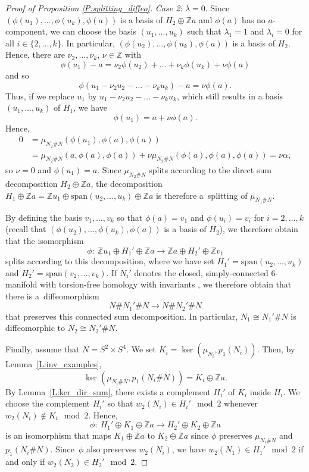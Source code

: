 \documentclass[pdftex]{sigma}
\numberwithin{equation}{section}
\theoremstyle{definition}
\numberwithin{table}{section}
\newcommand{\Z}{\mathbb{Z}}
\begin{document}
\begin{proof}[Proof of Proposition \ref{P:splitting_diffeo}]
\emph{Case 2}: $\lambda=0$. Since $(\phi(u_1),\dots,\phi(u_k),\phi(a))$ is a basis of $H_2\oplus\Z a$ and $\phi(a)$ has no $a$\nobreakdash-component, we can choose the basis $(u_1,\dots,u_k)$ such that $\lambda_1=1$ and $\lambda_i=0$ for all $i\in\{2,\dots,k\}$. In particular, $(\phi(u_2),\dots,\phi(u_k),\phi(a))$ is a basis of $H_2$. Hence, there are $\nu_2,\dots,\nu_k$, ${\nu\in\Z}$ with
		\[ \phi(u_1)-a=\nu_2\phi(u_2)+\dots+\nu_k\phi(u_k)+\nu\phi(a) \]
		and so
		\[ \phi(u_1-\nu_2 u_2 -\dots-\nu_k u_k )-a=\nu\phi(a). \]
		Thus, if we replace $u_1$ by $u_1-\nu_2 u_2 -\dots-\nu_k u_k$, which still results in a basis $(u_1,\dots,u_k)$ of $H_1$, we have
		\[ \phi(u_1)=a+\nu\phi(a). \]
Hence,
		\begin{align*}
        0&=\mu_{N_2\#N}(\phi(u_1),\phi(a),\phi(a))\\
        &=\mu_{N_2\#N}(a,\phi(a),\phi(a))+\nu\mu_{N_2\#N}(\phi(a),\phi(a),\phi(a))=\nu\alpha,
        \end{align*}
		so $\nu=0$ and $\phi(u_1)=a$. Since $\mu_{N_2\# N}$ splits according to the direct sum decomposition $H_2\oplus\Z a$, the decomposition $H_1\oplus \Z a=\Z u_1\oplus \mathrm{span}(u_2,\dots,u_k)\oplus \Z a$ is therefore a~splitting of $\mu_{N_1\# N}$.
		
		By defining the basis $v_1,\dots,v_k$ so that $\phi(a)=v_1$ and $\phi(u_i)=v_i$ for $i=2,\dots,k$ (recall that $(\phi(u_2),\dots,\phi(u_k),\phi(a))$ is a basis of $H_2$), we therefore obtain that the isomorphism
		\[ \phi\colon\ \Z u_1\oplus H_1'\oplus \Z a\to \Z a\oplus H_2'\oplus \Z v_1 \]
		splits according to this decomposition, where we have set $H_1'=\mathrm{span}(u_2,\dots,u_k)$ and $H_2'=\mathrm{span}(v_2,\dots,v_k)$. If $N_i'$ denotes the closed, simply-connected $6$-manifold with torsion-free homology with invariants , we therefore obtain that there is a~diffeomorphism
		\[ N\# N_1'\# N\to N\# N_2'\# N \]
		that preserves this connected sum decomposition. In particular, $N_1\cong N_1'\# N$ is diffeomorphic to $N_2\cong N_2'\# N$.
	
	Finally, assume that $N=S^2\times S^4$. We set $K_i=\ker(\mu_{N_i},p_1(N_i))$. Then, by Lemma~\ref{L:inv_examples},
	\[\ker(\mu_{N_i\# N},p_1(N_i\#N))=K_i\oplus\Z a.\]
	By Lemma~\ref{L:ker_dir_sum}, there exists a complement $H_i'$ of $K_i$ inside $H_i$. We choose the complement $H_i'$ so that $w_2(N_i)\in H_i'\mod 2$ whenever $w_2(N_i)\not\in K_i\mod 2$. Hence,
	\[ \phi\colon\ H_1'\oplus K_1\oplus\Z a\to H_2'\oplus K_2\oplus\Z a \]
	is an isomorphism that maps $K_1\oplus\Z a$ to $K_2\oplus\Z a$ since $\phi$ preserves $\mu_{N_i\# N}$ and $p_1(N_i\# N)$. Since~$\phi$ also preserves $w_2(N_i)$, we have $w_2(N_1)\in H_1'\mod 2$ if and only if $w_2(N_2)\in H_2'\mod 2$.
	

\end{proof}
\end{document}
